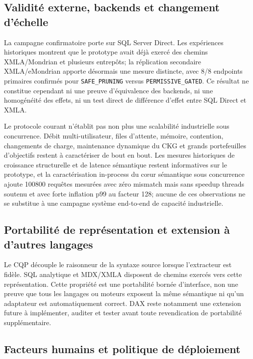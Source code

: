 \documentclass[journal]{IEEEtran}
\begin{document}
\subsection{Validité externe, backends et changement d'échelle}

La campagne confirmatoire porte sur SQL Server Direct. Les expériences historiques montrent que le prototype avait déjà exercé des chemins XMLA/Mondrian et plusieurs entrepôts; la réplication secondaire XMLA/eMondrian apporte désormais une mesure distincte, avec 8/8 endpoints primaires confirmés pour \texttt{SAFE\_PRUNING} versus \texttt{PERMISSIVE\_GATED}. Ce résultat ne constitue cependant ni une preuve d'équivalence des backends, ni une homogénéité des effets, ni un test direct de différence d'effet entre SQL Direct et XMLA.

Le protocole courant n'établit pas non plus une scalabilité industrielle sous concurrence. Débit multi-utilisateur, files d'attente, mémoire, contention, changements de charge, maintenance dynamique du CKG et grands portefeuilles d'objectifs restent à caractériser de bout en bout. Les mesures historiques de croissance structurelle et de latence sémantique restent informatives sur le prototype, et la caractérisation in-process du cœur sémantique sous concurrence ajoute 100800 requêtes mesurées avec zéro mismatch mais sans speedup threads soutenu et avec forte inflation p99 au facteur 128; aucune de ces observations ne se substitue à une campagne système end-to-end de capacité industrielle.

\subsection{Portabilité de représentation et extension à d'autres langages}

Le CQP découple le raisonneur de la syntaxe source lorsque l'extracteur est fidèle. SQL analytique et MDX/XMLA disposent de chemins exercés vers cette représentation. Cette propriété est une portabilité bornée d'interface, non une preuve que tous les langages ou moteurs exposent la même sémantique ni qu'un adaptateur est automatiquement correct. DAX reste notamment une extension future à implémenter, auditer et tester avant toute revendication de portabilité supplémentaire.

\subsection{Facteurs humains et politique de déploiement}
\end{document}
